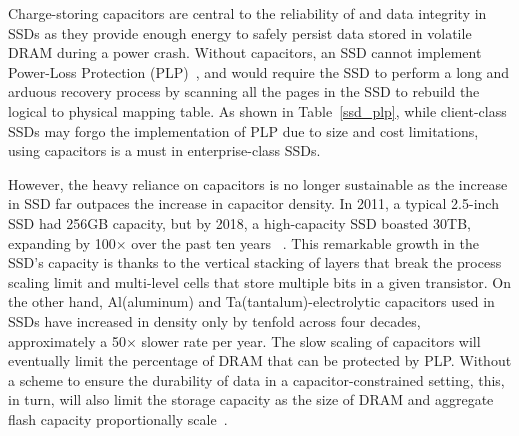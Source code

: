 Charge-storing capacitors are central to the reliability of and data integrity in SSDs 
as they provide enough energy to safely persist data stored in volatile DRAM during a power crash. 
Without capacitors, an SSD cannot implement Power-Loss Protection (PLP)~\cite{micron2014, intel2014, samsungplp2016}, 
and would require the SSD to perform a long and arduous recovery process by scanning all the pages in the SSD to rebuild the logical to physical mapping table. 
As shown in Table~\ref{ssd_plp}, 
while client-class SSDs may forgo the implementation of PLP due to size and cost limitations, 
using capacitors is a must in enterprise-class SSDs. 



However, the heavy reliance on capacitors is no longer sustainable as the increase in SSD far outpaces 
the increase in capacitor density.
In 2011, a typical 2.5-inch SSD had 256GB capacity, but
by 2018, a high-capacity SSD boasted 30TB, expanding by 100$\times$ over the past ten years
~\cite{samsung2011, anandtech18samsung}. 
This remarkable growth in the SSD's capacity is thanks to the vertical stacking of layers that break the process scaling limit and multi-level cells that store multiple bits in a given transistor.
On the other hand, Al(aluminum) and Ta(tantalum)-electrolytic capacitors used in SSDs 
have increased in density only by tenfold across four decades,
approximately a 50$\times$ slower rate per year. 
The slow scaling of capacitors will eventually limit the percentage of DRAM that can be protected by PLP.
Without a scheme to ensure the durability of data in a capacitor-constrained setting, 
this, in turn, will also limit the storage capacity as the size of DRAM and aggregate flash capacity proportionally scale~\cite{ni2017hash}. 

